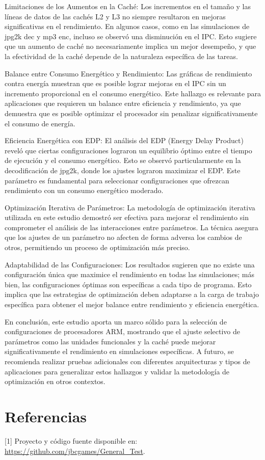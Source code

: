 \documentclass[conference]{IEEEtran}
\begin{document}
Limitaciones de los Aumentos en la Caché: Los incrementos en el tamaño y las líneas de datos de las cachés L2 y L3 no siempre resultaron en mejoras significativas en el rendimiento. En algunos casos, como en las simulaciones de jpg2k dec y mp3 enc, incluso se observó una disminución en el IPC. Esto sugiere que un aumento de caché no necesariamente implica un mejor desempeño, y que la efectividad de la caché depende de la naturaleza específica de las tareas.

Balance entre Consumo Energético y Rendimiento: Las gráficas de rendimiento contra energía muestran que es posible lograr mejoras en el IPC sin un incremento proporcional en el consumo energético. Este hallazgo es relevante para aplicaciones que requieren un balance entre eficiencia y rendimiento, ya que demuestra que es posible optimizar el procesador sin penalizar significativamente el consumo de energía.

Eficiencia Energética con EDP: El análisis del EDP (Energy Delay Product) reveló que ciertas configuraciones lograron un equilibrio óptimo entre el tiempo de ejecución y el consumo energético. Esto se observó particularmente en la decodificación de jpg2k, donde los ajustes lograron maximizar el EDP. Este parámetro es fundamental para seleccionar configuraciones que ofrezcan rendimiento con un consumo energético moderado.

Optimización Iterativa de Parámetros: La metodología de optimización iterativa utilizada en este estudio demostró ser efectiva para mejorar el rendimiento sin comprometer el análisis de las interacciones entre parámetros. La técnica asegura que los ajustes de un parámetro no afecten de forma adversa los cambios de otros, permitiendo un proceso de optimización más preciso.

Adaptabilidad de las Configuraciones: Los resultados sugieren que no existe una configuración única que maximice el rendimiento en todas las simulaciones; más bien, las configuraciones óptimas son específicas a cada tipo de programa. Esto implica que las estrategias de optimización deben adaptarse a la carga de trabajo específica para obtener el mejor balance entre rendimiento y eficiencia energética.

En conclusión, este estudio aporta un marco sólido para la selección de configuraciones de procesadores ARM, mostrando que el ajuste selectivo de parámetros como las unidades funcionales y la caché puede mejorar significativamente el rendimiento en simulaciones específicas. A futuro, se recomienda realizar pruebas adicionales con diferentes arquitecturas y tipos de aplicaciones para generalizar estos hallazgos y validar la metodología de optimización en otros contextos.

\section{Referencias}

[1] Proyecto y código fuente disponible en: \url{https://github.com/jbcgames/General_Test}.
\end{document}
